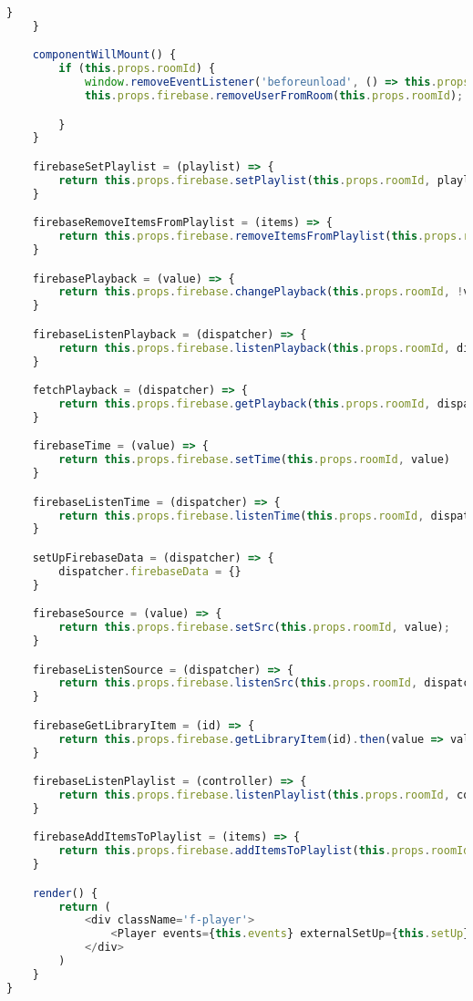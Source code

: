 \begin{lstlisting}[language=JavaScript,label={lst:add:player}]
        }
    }

    componentWillMount() {
        if (this.props.roomId) {
            window.removeEventListener('beforeunload', () => this.props.firebase.removeUserFromRoom(this.props.roomId));
            this.props.firebase.removeUserFromRoom(this.props.roomId);

        }
    }

    firebaseSetPlaylist = (playlist) => {
        return this.props.firebase.setPlaylist(this.props.roomId, playlist);
    }

    firebaseRemoveItemsFromPlaylist = (items) => {
        return this.props.firebase.removeItemsFromPlaylist(this.props.roomId, items);
    }

    firebasePlayback = (value) => {
        return this.props.firebase.changePlayback(this.props.roomId, !value)
    }

    firebaseListenPlayback = (dispatcher) => {
        return this.props.firebase.listenPlayback(this.props.roomId, dispatcher);
    }

    fetchPlayback = (dispatcher) => {
        return this.props.firebase.getPlayback(this.props.roomId, dispatcher);
    }

    firebaseTime = (value) => {
        return this.props.firebase.setTime(this.props.roomId, value)
    }

    firebaseListenTime = (dispatcher) => {
        return this.props.firebase.listenTime(this.props.roomId, dispatcher);
    }

    setUpFirebaseData = (dispatcher) => {
        dispatcher.firebaseData = {}
    }

    firebaseSource = (value) => {
        return this.props.firebase.setSrc(this.props.roomId, value);
    }

    firebaseListenSource = (dispatcher) => {
        return this.props.firebase.listenSrc(this.props.roomId, dispatcher);
    }

    firebaseGetLibraryItem = (id) => {
        return this.props.firebase.getLibraryItem(id).then(value => value)
    }

    firebaseListenPlaylist = (controller) => {
        return this.props.firebase.listenPlaylist(this.props.roomId, controller)
    }

    firebaseAddItemsToPlaylist = (items) => {
        return this.props.firebase.addItemsToPlaylist(this.props.roomId, items)
    }

    render() {
        return (
            <div className='f-player'>
                <Player events={this.events} externalSetUp={this.setUp} libraryLogic={this.libraryLogic} playlistLogic={this.playlistLogic} />
            </div>
        )
    }
}
\end{lstlisting}
